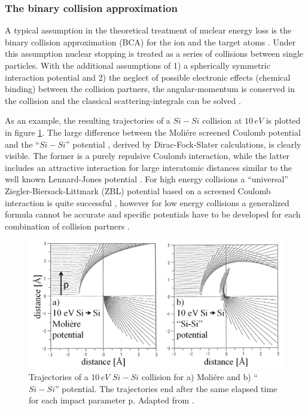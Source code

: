 
\subsubsection{The binary collision approximation}

A typical assumption in the theoretical treatment of nuclear energy loss is the binary collision approximation (BCA) for the ion and the target atoms \cite{eckstein_computer_1991}. Under this assumption nuclear stopping is treated as a series of collisions between single particles. With the additional assumptions of 1) a spherically symmetric interaction potential and 2) the neglect of possible electronic effects (chemical binding) between the collision partners, the angular-momentum is conserved in the collision and the classical scattering-integrals can be solved \cite{ziegler_stopping_1985}. 

As an example, the resulting trajectories of a $Si-Si$ collision at $10\,eV$ is plotted in figure \ref{SiSi}. The large difference between the Moliére screened Coulomb potential \cite{moliere_theorie_1947} and the ``$Si-Si$'' potential \cite{hackel_inter-nuclear_1990}, derived by Dirac-Fock-Slater calculations, is clearly visible. The former is a purely repulsive Coulomb interaction, while the latter includes an attractive interaction for large interatomic distances similar to the well known Lennard-Jones potential \cite{jones_determination_1924,eckstein_computer_1991}. For high energy collisions a ``universal'' Ziegler-Biersack-Littmark (ZBL) potential based on a screened Coulomb interaction is quite successful \cite{ziegler_stopping_1985}, however for low energy collisions a generalized formula cannot be accurate and specific potentials have to be developed for each combination of collision partners \cite{dedkov_interatomic_1995,nordlund_repulsive_1997,albe_modeling_2002,nordlund_interatomic_2008}.


\begin{figure}
	\centering
		\includegraphics[width=.75\textwidth]{images/SiSicollision.png}
	\caption{Trajectories of a $10\,eV$ $Si-Si$ collision for a) Moliére and b) ``$Si-Si$'' potential. The trajectories end after the same elapsed time for each impact parameter p. Adapted from \cite{eckstein_computer_1991}.}
	\label{SiSi}
\end{figure} 

